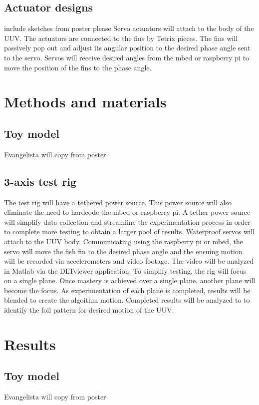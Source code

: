\documentclass[10pt]{article}
\begin{document}
\subsection{Actuator designs}
include sketches from poster please
Servo actuators will attach to the body of the UUV.  The actuators are connected to the fins by Tetrix pieces.  The fins will passively pop out and adjust its angular position to the desired phase angle sent to the servo.  Servos will receive desired angles from the mbed or raspberry pi to move the position of the fins to the phase angle.  

\section{Methods and materials}
\subsection{Toy model}
Evangelista will copy from poster
\subsection{3-axis test rig}
The test rig will have a tethered power source.  This power source will also eliminate the need to hardcode the mbed or raspberry pi.  A tether power source will simplify data collection and streamline the experimentation process in order to complete more testing to obtain a larger pool of results.  Waterproof servos will attach to the UUV body.  Communicating using the raspberry pi or mbed, the servo will move the fish fin to the desired phase angle and the ensuing motion will be recorded via accelerometers and video footage.  The video will be analyzed in Matlab via the DLTviewer application.  To simplify testing, the rig will focus on a single plane.  Once mastery is achieved over a single plane, another plane will become the focus.  As experimentation of each plane is completed, results will be blended to create the algoithm motion.  Completed results will be analyzed to to identify the foil pattern for desired motion of the UUV. 
\section{Results}
\subsection{Toy model}
Evangelista will copy from poster
\end{document}
